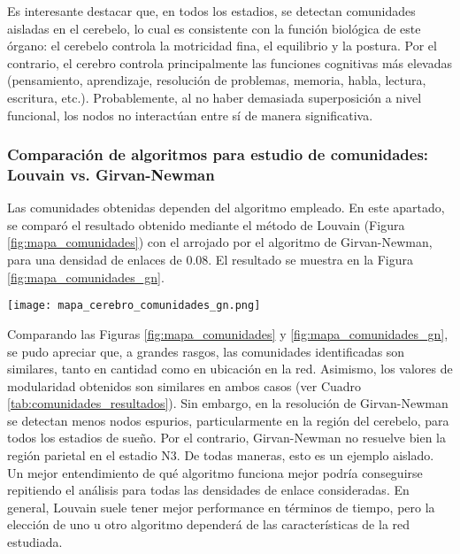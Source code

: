 \documentclass[a4paper,10pt,twocolumn,spanish]{article}
\begin{document}
Es interesante destacar que, en todos los estadios, se detectan comunidades aisladas en el cerebelo, lo cual es consistente con la función biológica de este órgano: el cerebelo controla la motricidad fina, el equilibrio y la postura. Por el contrario, el cerebro controla principalmente las funciones cognitivas más elevadas (pensamiento, aprendizaje, resolución de problemas, memoria, habla, lectura, escritura, etc.). Probablemente, al no haber demasiada  superposición a nivel funcional, los nodos no interactúan entre sí de manera significativa.

\subsubsection{Comparación de algoritmos para estudio de comunidades: Louvain vs. Girvan-Newman}

Las comunidades obtenidas dependen del algoritmo empleado. En este apartado, se comparó el resultado obtenido mediante el método de Louvain (Figura \ref{fig:mapa_comunidades}) con el arrojado por el algoritmo de Girvan-Newman, para una densidad de enlaces de 0.08. El resultado se muestra en la Figura \ref{fig:mapa_comunidades_gn}.

\begin{figure*}[htb]
\centering
\texttt{[image: mapa\_cerebro\_comunidades\_gn.png]}
\caption{Comunidades presentes - Comparación entre estados (algoritmo de Girvan-Newman)}
\label{fig:mapa_comunidades_gn}
\end{figure*}

Comparando las Figuras \ref{fig:mapa_comunidades} y \ref{fig:mapa_comunidades_gn}, se pudo apreciar que, a grandes rasgos, las comunidades identificadas son similares, tanto en cantidad como en ubicación en la red. Asimismo, los valores de modularidad obtenidos son similares en ambos casos (ver Cuadro \ref{tab:comunidades_resultados}). Sin embargo, en la resolución de Girvan-Newman se detectan menos nodos espurios, particularmente en la región del cerebelo, para todos los estadios de sueño. Por el contrario, Girvan-Newman no resuelve bien la región parietal en el estadio N3. De todas maneras, esto es un ejemplo aislado. Un mejor entendimiento de qué algoritmo funciona mejor podría conseguirse repitiendo el análisis para todas las densidades de enlace consideradas. En general, Louvain suele tener mejor performance en términos de tiempo, pero la elección de uno u otro algoritmo dependerá de las características de la red estudiada.
\end{document}
